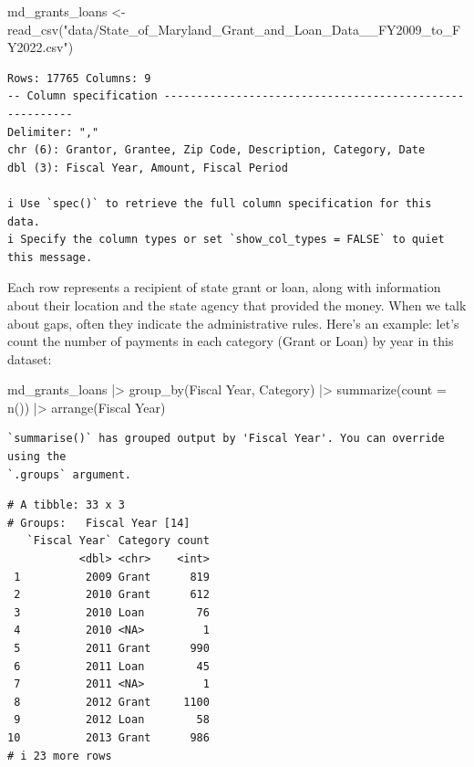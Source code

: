 \documentclass[
  letterpaper,
  DIV=11,
  numbers=noendperiod]{scrreprt}
\newenvironment{Shaded}{\begin{snugshade}}{\end{snugshade}}
\newcommand{\AttributeTok}[1]{\textcolor[rgb]{0.40,0.45,0.13}{#1}}
\newcommand{\FunctionTok}[1]{\textcolor[rgb]{0.28,0.35,0.67}{#1}}
\newcommand{\NormalTok}[1]{\textcolor[rgb]{0.00,0.23,0.31}{#1}}
\newcommand{\OtherTok}[1]{\textcolor[rgb]{0.00,0.23,0.31}{#1}}
\newcommand{\SpecialCharTok}[1]{\textcolor[rgb]{0.37,0.37,0.37}{#1}}
\newcommand{\StringTok}[1]{\textcolor[rgb]{0.13,0.47,0.30}{#1}}
\begin{document}
\begin{Shaded}
\begin{Highlighting}[]
\NormalTok{md\_grants\_loans }\OtherTok{\textless{}{-}} \FunctionTok{read\_csv}\NormalTok{(}\StringTok{"data/State\_of\_Maryland\_Grant\_and\_Loan\_Data\_\_FY2009\_to\_FY2022.csv"}\NormalTok{)}
\end{Highlighting}
\end{Shaded}

\begin{verbatim}
Rows: 17765 Columns: 9
-- Column specification --------------------------------------------------------
Delimiter: ","
chr (6): Grantor, Grantee, Zip Code, Description, Category, Date
dbl (3): Fiscal Year, Amount, Fiscal Period

i Use `spec()` to retrieve the full column specification for this data.
i Specify the column types or set `show_col_types = FALSE` to quiet this message.
\end{verbatim}

Each row represents a recipient of state grant or loan, along with
information about their location and the state agency that provided the
money. When we talk about gaps, often they indicate the administrative
rules. Here's an example: let's count the number of payments in each
category (Grant or Loan) by year in this dataset:

\begin{Shaded}
\begin{Highlighting}[]
\NormalTok{md\_grants\_loans }\SpecialCharTok{|\textgreater{}} 
  \FunctionTok{group\_by}\NormalTok{(}\StringTok{\textasciigrave{}}\AttributeTok{Fiscal Year}\StringTok{\textasciigrave{}}\NormalTok{, Category) }\SpecialCharTok{|\textgreater{}} 
  \FunctionTok{summarize}\NormalTok{(}\AttributeTok{count =} \FunctionTok{n}\NormalTok{()) }\SpecialCharTok{|\textgreater{}} 
  \FunctionTok{arrange}\NormalTok{(}\StringTok{\textasciigrave{}}\AttributeTok{Fiscal Year}\StringTok{\textasciigrave{}}\NormalTok{)}
\end{Highlighting}
\end{Shaded}

\begin{verbatim}
`summarise()` has grouped output by 'Fiscal Year'. You can override using the
`.groups` argument.
\end{verbatim}

\begin{verbatim}
# A tibble: 33 x 3
# Groups:   Fiscal Year [14]
   `Fiscal Year` Category count
           <dbl> <chr>    <int>
 1          2009 Grant      819
 2          2010 Grant      612
 3          2010 Loan        76
 4          2010 <NA>         1
 5          2011 Grant      990
 6          2011 Loan        45
 7          2011 <NA>         1
 8          2012 Grant     1100
 9          2012 Loan        58
10          2013 Grant      986
# i 23 more rows
\end{verbatim}
\end{document}
